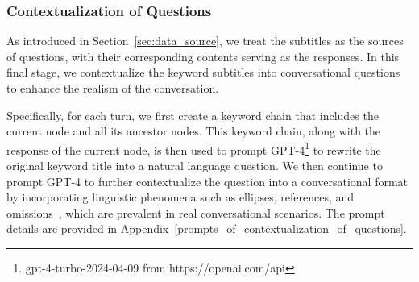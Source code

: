 \documentclass[11pt]{article}
\begin{document}







\subsubsection{Contextualization of Questions}
\label{question_generation}
As introduced in Section~\ref{sec:data_source}, we treat the subtitles as the sources of questions, with their corresponding contents serving as the responses. In this final stage, we contextualize the keyword subtitles into conversational questions to enhance the realism of the conversation.

Specifically, for each turn, we first create a keyword chain that includes the current node and all its ancestor nodes. This keyword chain, along with the response of the current node, is then used to prompt GPT-4\footnote{gpt-4-turbo-2024-04-09 from https://openai.com/api\label{gpt-4}} to rewrite the original keyword title into a natural language question. We then continue to prompt GPT-4 to further contextualize the question into a conversational format by incorporating linguistic phenomena such as ellipses, references, and omissions~\citep{cast19}, which are prevalent in real conversational scenarios.
The prompt details are provided in Appendix~\ref{prompts_of_contextualization_of_questions}.
\end{document}
